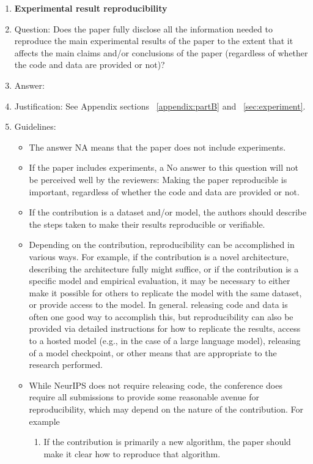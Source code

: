 \documentclass{article}
\begin{document}
\begin{enumerate}
    \item {\bf Experimental result reproducibility}
    \item[] Question: Does the paper fully disclose all the information needed to reproduce the main experimental results of the paper to the extent that it affects the main claims and/or conclusions of the paper (regardless of whether the code and data are provided or not)?
    \item[] Answer: \answerYes{} %
    \item[] Justification: See Appendix sections ~\ref{appendix:partB} and ~\ref{sec:experiment}.
    \item[] Guidelines:
    \begin{itemize}
        \item The answer NA means that the paper does not include experiments.
        \item If the paper includes experiments, a No answer to this question will not be perceived well by the reviewers: Making the paper reproducible is important, regardless of whether the code and data are provided or not.
        \item If the contribution is a dataset and/or model, the authors should describe the steps taken to make their results reproducible or verifiable. 
        \item Depending on the contribution, reproducibility can be accomplished in various ways. For example, if the contribution is a novel architecture, describing the architecture fully might suffice, or if the contribution is a specific model and empirical evaluation, it may be necessary to either make it possible for others to replicate the model with the same dataset, or provide access to the model. In general. releasing code and data is often one good way to accomplish this, but reproducibility can also be provided via detailed instructions for how to replicate the results, access to a hosted model (e.g., in the case of a large language model), releasing of a model checkpoint, or other means that are appropriate to the research performed.
        \item While NeurIPS does not require releasing code, the conference does require all submissions to provide some reasonable avenue for reproducibility, which may depend on the nature of the contribution. For example
        \begin{enumerate}
            \item If the contribution is primarily a new algorithm, the paper should make it clear how to reproduce that algorithm.

\end{enumerate}
\end{itemize}
\end{enumerate}
\end{document}
